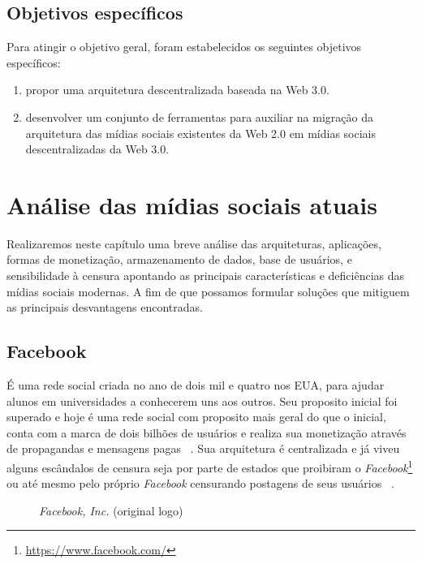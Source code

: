 \section{Objetivos específicos}

Para atingir o objetivo geral, foram estabelecidos os seguintes objetivos específicos:

\begin{enumerate}
    \item propor uma arquitetura descentralizada baseada na Web 3.0.
    \item desenvolver um conjunto de ferramentas para auxiliar na migração da arquitetura das mídias sociais existentes da Web 2.0 em mídias sociais descentralizadas da Web 3.0.
\end{enumerate}

\chapter{Análise das mídias sociais atuais}

Realizaremos neste capítulo uma breve análise das arquiteturas, aplicações, formas de monetização, armazenamento de dados, base de usuários, e sensibilidade à censura apontando as principais características e deficiências das mídias sociais modernas.
A fim de que possamos formular soluções que mitiguem as principais desvantagens encontradas.

\section{Facebook}

É uma rede social criada no ano de dois mil e quatro nos EUA, para ajudar alunos em universidades a conhecerem uns aos outros.
Seu proposito inicial foi superado e hoje é uma rede social com proposito mais geral do que o inicial,
conta com a marca de dois bilhões de usuários e realiza sua monetização através de propagandas e mensagens pagas~\cite{Facebook1} \cite{Facebook2}.
Sua arquitetura é centralizada e já viveu alguns escândalos de censura seja por parte de estados que proibiram o \textit{Facebook}\footnote{\url{https://www.facebook.com/}} ou até mesmo pelo próprio \textit{Facebook} censurando postagens de seus usuários~\cite{Facebook4} \cite{Facebook5}.

\begin{figure}[htb!]
    \centering
    
    \caption[Facebook's logo]{\label{fig:facebook-icon}
        \textit{Facebook, Inc.} (original logo) %
    }
\end{figure}

